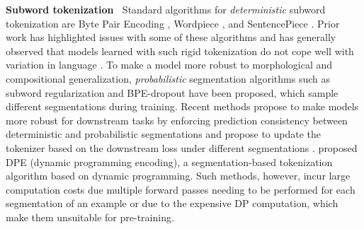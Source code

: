 \documentclass{article} \usepackage{iclr2022_conference,times}
\begin{document}
\noindent \textbf{Subword tokenization} $\:$ Standard algorithms for \emph{deterministic} subword tokenization are Byte Pair Encoding \citep[BPE;][]{sennrich-etal-2016-neural}, Wordpiece \citep{Wu2016nmt}, and SentencePiece \citep{kudo-richardson-2018-sentencepiece}. Prior work has highlighted issues with some of these algorithms \citep{Bostrom2020} and has generally observed that models learned with such rigid tokenization do not cope well with variation in language \citep{sun2020adv}. To make a model more robust to morphological and compositional generalization, \emph{probabilistic} segmentation algorithms such as subword regularization \citep{kudo-2018-subword} and BPE-dropout \citep{provilkov-etal-2020-bpe} have been proposed, which sample different segmentations during training. Recent methods propose to make models more robust for downstream tasks by enforcing prediction consistency between deterministic and probabilistic segmentations \citep{Wang2021multi-view} and propose to update the tokenizer based on the downstream loss under different segmentations \citep{hiraoka-etal-2020-optimizing,Hiraoka2021joint}. \citet{he-etal-2020-dynamic} proposed DPE (dynamic programming encoding), a segmentation-based tokenization algorithm based on dynamic programming. Such methods, however, incur large computation costs due multiple forward passes needing to be performed for each segmentation of an example or due to the expensive DP computation, which make them unsuitable for pre-training. 
\end{document}

